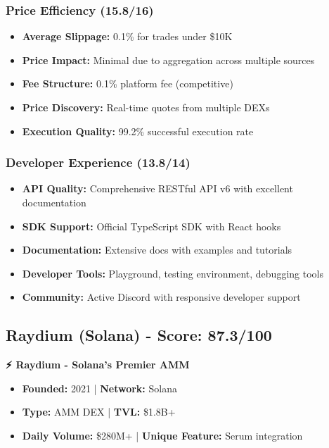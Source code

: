 \documentclass[11pt,a4paper]{article}
\begin{document}
\subsubsection{Price Efficiency (15.8/16)}

\begin{itemize}
    \item \textbf{Average Slippage:} 0.1\% for trades under \$10K
    \item \textbf{Price Impact:} Minimal due to aggregation across multiple sources
    \item \textbf{Fee Structure:} 0.1\% platform fee (competitive)
    \item \textbf{Price Discovery:} Real-time quotes from multiple DEXs
    \item \textbf{Execution Quality:} 99.2\% successful execution rate
\end{itemize}

\subsubsection{Developer Experience (13.8/14)}

\begin{itemize}
    \item \textbf{API Quality:} Comprehensive RESTful API v6 with excellent documentation
    \item \textbf{SDK Support:} Official TypeScript SDK with React hooks
    \item \textbf{Documentation:} Extensive docs with examples and tutorials
    \item \textbf{Developer Tools:} Playground, testing environment, debugging tools
    \item \textbf{Community:} Active Discord with responsive developer support
\end{itemize}

\subsection{Raydium (Solana) - Score: 87.3/100}

\begin{tcolorbox}[colback=solanaGreen!10,colframe=solanaGreen]
\textbf{⚡ Raydium - Solana's Premier AMM}
\begin{itemize}
    \item \textbf{Founded:} 2021 | \textbf{Network:} Solana
    \item \textbf{Type:} AMM DEX | \textbf{TVL:} \$1.8B+
    \item \textbf{Daily Volume:} \$280M+ | \textbf{Unique Feature:} Serum integration
\end{itemize}
\end{tcolorbox}
\end{document}
